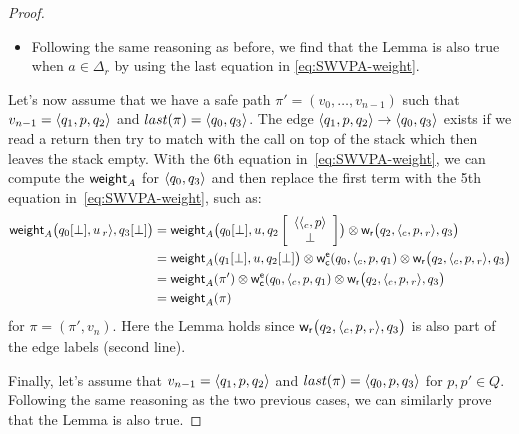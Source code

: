 \begin{proof}
\begin{itemize}
\item Following the same reasoning as before, we find that the Lemma is also true when $a \in \Delta_r$ by using the last equation in \eqref{eq:SWVPA-weight}.
%
\end{itemize}
\noindent
Let's now assume that we have a safe path $\pi' = (v_0,\ldots, v_{n-1})$ such that $v_{n-1} = \< q_1, p, q_2>$ and $last(\pi) = \< q_0, q_3>$. The edge $\< q_1, p, q_2> \to \< q_0, q_3>$ exists if we read a return then try to match with the call on top of the stack which then leaves the stack empty. With the 6th equation in~\eqref{eq:SWVPA-weight}, we can compute the $\mathsf{weight}_A$ for $\<q_0, q_3>$ and then replace the first term with the 5th equation in~\eqref{eq:SWVPA-weight}, such as:
\begin{align*}
\weight_A\bigl(\config{q_0}{\bot}, u\,{\return{r}},
               \config{q_3}{\bot}\bigr) &=
  \weight_A\bigl(\config{q_0}{\bot}, u,
                 \configup{q_2}{\<{\call{c}}, p>\stackup\bot}\bigr)
  \otimes \weir\bigl(q_2, {\call{c}}, p, {\return{r}}, q_3\bigr)\\
  &=
   \weight_A(\config{q_1}{\bot}, u, \config{q_2}{\bot}\bigr)
 \otimes \weiec(q_0, {\call{c}}, p, q_1)
  \otimes \weir\bigl(q_2, {\call{c}}, p, {\return{r}}, q_3\bigr)\\
  &= \weight_A(\pi')\otimes \weiec(q_0, {\call{c}}, p, q_1)
  \otimes \weir\bigl(q_2, {\call{c}}, p, {\return{r}}, q_3\bigr)\\
  &= \weight_A(\pi)
\end{align*}
for $\pi = (\pi', v_n)$. Here the Lemma holds since ${\mathsf{w}_\mathsf{r}}\bigl(q_2, {\langle_{c}}, p, {_{r}{\rangle}}, q_3\bigr)$ is also part of the edge labels (second line).

Finally, let's assume that $v_{n-1} = \<q_1, p, q_2>$ and $last(\pi) = \<q_0, p, q_3>$ for $p, p' \in Q$. Following the same reasoning as the two previous cases, we can similarly prove that the Lemma is also true.

\end{proof}



